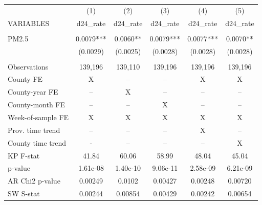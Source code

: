 \begin{tabular}{lccccc} \hline
 & (1) & (2) & (3) & (4) & (5) \\
VARIABLES & d24\_rate & d24\_rate & d24\_rate & d24\_rate & d24\_rate \\ \hline
 &  &  &  &  &  \\
PM2.5 & 0.0079*** & 0.0060** & 0.0079*** & 0.0077*** & 0.0070** \\
 & (0.0029) & (0.0025) & (0.0028) & (0.0028) & (0.0028) \\
 &  &  &  &  &  \\
Observations & 139,196 & 139,110 & 139,196 & 139,196 & 139,196 \\
County FE & X & -- & -- & X & X \\
County-year FE & -- & X & -- & -- & -- \\
County-month FE & -- & -- & X & -- & -- \\
Week-of-sample FE & X & X & X & X & X \\
Prov. time trend & -- & -- & -- & X & -- \\
County time trend & - & -- & -- & -- & X \\
KP F-stat & 41.84 & 60.06 & 58.99 & 48.04 & 45.04 \\
p-value & 1.61e-08 & 1.40e-10 & 9.06e-11 & 2.58e-09 & 6.21e-09 \\
AR Chi2 p-value & 0.00249 & 0.0102 & 0.00427 & 0.00248 & 0.00720 \\
 SW S-stat & 0.00244 & 0.00854 & 0.00429 & 0.00242 & 0.00654 \\ \hline
\end{tabular}
